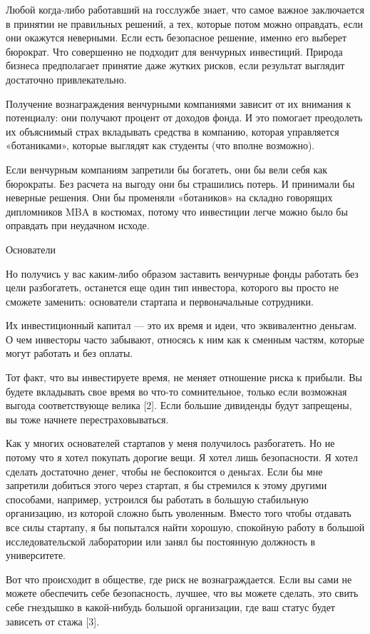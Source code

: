 \documentclass[ebook,12pt,oneside,openany]{memoir}
\begin{document}
Любой когда-либо работавший на госслужбе знает, что самое важное
заключается в принятии не правильных решений, а тех, которые потом
можно оправдать, если они окажутся неверными. Если есть безопасное
решение, именно его выберет бюрократ. Что совершенно не подходит для
венчурных инвестиций. Природа бизнеса предполагает принятие даже
жутких рисков, если результат выглядит достаточно привлекательно.

Получение вознаграждения венчурными компаниями зависит от их внимания
к потенциалу: они получают процент от доходов фонда. И это помогает
преодолеть их объяснимый страх вкладывать средства в компанию, которая
управляется «ботаниками», которые выглядят как студенты (что вполне
возможно).

Если венчурным компаниям запретили бы богатеть, они бы вели себя как
бюрократы. Без расчета на выгоду они бы страшились потерь. И принимали
бы неверные решения. Они бы променяли «ботаников» на складно говорящих
дипломников MBA в костюмах, потому что инвестиции легче можно было бы
оправдать при неудачном исходе.

Основатели

Но получись у вас каким-либо образом заставить венчурные фонды
работать без цели разбогатеть, останется еще один тип инвестора,
которого вы просто не сможете заменить: основатели стартапа и
первоначальные сотрудники.

Их инвестиционный капитал — это их время и идеи, что эквивалентно
деньгам. О чем инвесторы часто забывают, относясь к ним как к сменным
частям, которые могут работать и без оплаты.

Тот факт, что вы инвестируете время, не меняет отношение риска к
прибыли. Вы будете вкладывать свое время во что-то сомнительное,
только если возможная выгода соответствующе велика [2]. Если большие
дивиденды будут запрещены, вы тоже начнете перестраховываться.

Как у многих основателей стартапов у меня получилось разбогатеть. Но
не потому что я хотел покупать дорогие вещи. Я хотел лишь
безопасности. Я хотел сделать достаточно денег, чтобы не беспокоится о
деньгах. Если бы мне запретили добиться этого через стартап, я бы
стремился к этому другими способами, например, устроился бы работать в
большую стабильную организацию, из которой сложно быть уволенным.
Вместо того чтобы отдавать все силы стартапу, я бы попытался найти
хорошую, спокойную работу в большой исследовательской лаборатории или
занял бы постоянную должность в университете.

Вот что происходит в обществе, где риск не вознаграждается. Если вы
сами не можете обеспечить себе безопасность, лучшее, что вы можете
сделать, это свить себе гнездышко в какой-нибудь большой организации,
где ваш статус будет зависеть от стажа [3].
\end{document}
